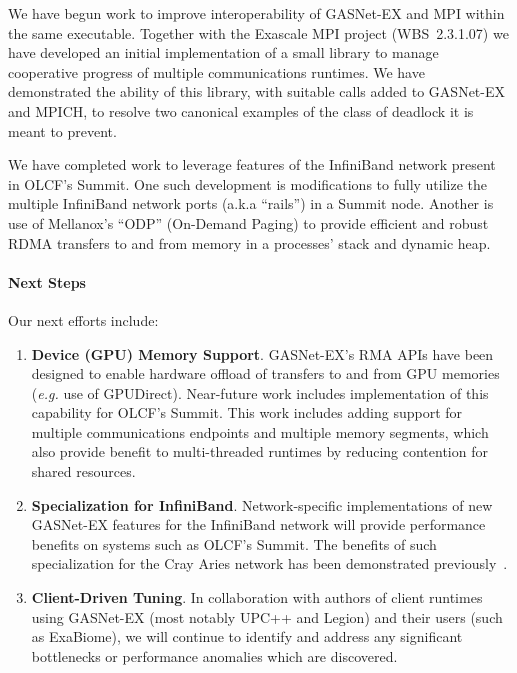 We have begun work to improve interoperability of GASNet-EX and MPI within the
same executable.  Together with the Exascale MPI project (WBS~2.3.1.07) we have
developed an initial implementation of a small library to manage cooperative
progress of multiple communications runtimes.  We have demonstrated the ability
of this library, with suitable calls added to GASNet-EX and MPICH, to resolve
two canonical examples of the class of deadlock it is meant to prevent.

We have completed work to leverage features of the InfiniBand network
present in OLCF's Summit.  One such development is modifications to fully
utilize the multiple InfiniBand network ports (a.k.a ``rails'') in a Summit
node.  Another is use of Mellanox's ``ODP'' (On-Demand Paging) to provide
efficient and robust RDMA transfers to and from memory in a processes' stack
and dynamic heap.

\paragraph{Next Steps}

Our next efforts include:
\begin{enumerate}

\item \textbf{Device (GPU) Memory Support}.
GASNet-EX's RMA APIs have been designed to enable hardware offload of
transfers to and from GPU memories (\textit{e.g.} use of GPUDirect).
Near-future work includes implementation of this capability for OLCF's
Summit.  This work includes adding support for multiple
communications endpoints and multiple memory segments, which also provide
benefit to multi-threaded runtimes by reducing contention for shared resources.

\item \textbf{Specialization for InfiniBand}.  Network-specific implementations
of new GASNet-EX features for the InfiniBand network will provide performance
benefits on systems such as OLCF's Summit.  The benefits of such specialization
for the Cray Aries network has been demonstrated previously~\cite{gasnet-aries}.

\item \textbf{Client-Driven Tuning}.  In collaboration with authors of client
runtimes using GASNet-EX (most notably UPC++ and Legion) and their users (such
as ExaBiome), we will continue to identify and address any significant
bottlenecks or performance anomalies which are discovered.

\end{enumerate}
